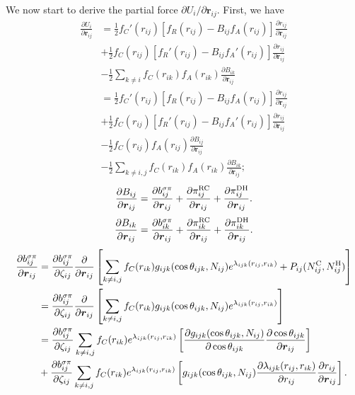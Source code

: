 \documentclass[12pt,a4paper]{report}
\newcommand{\vect}[1]{\boldsymbol{#1}}
\begin{document}
We now start to derive the partial force $\partial U_i/\partial \vect{r}_{ij}$. First, we have
\begin{align}
\frac{\partial U_i}{\partial \vect{r}_{ij}}
&= \frac{1}{2}f_C'(r_{ij})[f_R(r_{ij})-B_{ij}f_A(r_{ij})]\frac{\partial r_{ij}}{\partial \vect{r}_{ij}} \nonumber \\
&+ \frac{1}{2}f_C(r_{ij})[f_R'(r_{ij})-B_{ij}f_A'(r_{ij})]\frac{\partial r_{ij}}{\partial \vect{r}_{ij}} \nonumber \\
&- \frac{1}{2} \sum_{k\neq i} f_C(r_{ik})f_A(r_{ik}) \frac{\partial  B_{ik}}{\partial \vect{r}_{ij}} \nonumber\\
&= \frac{1}{2}f_C'(r_{ij})[f_R(r_{ij})-B_{ij}f_A(r_{ij})]\frac{\partial r_{ij}}{\partial \vect{r}_{ij}} \nonumber \\
&+ \frac{1}{2}f_C(r_{ij})[f_R'(r_{ij})-B_{ij}f_A'(r_{ij})]\frac{\partial r_{ij}}{\partial \vect{r}_{ij}} \nonumber \\
&- \frac{1}{2}  f_C(r_{ij})f_A(r_{ij}) \frac{\partial  B_{ij}}{\partial \vect{r}_{ij}} \nonumber\\
&- \frac{1}{2} \sum_{k\neq i,j} f_C(r_{ik})f_A(r_{ik}) \frac{\partial  B_{ik}}{\partial \vect{r}_{ij}};
\end{align}
\begin{align}
\frac{\partial  B_{ij}}{\partial \vect{r}_{ij}} = 
\frac{\partial  b_{ij}^{\sigma\pi}}{\partial \vect{r}_{ij}} +
\frac{\partial  \pi_{ij}^{\rm RC}}{\partial \vect{r}_{ij}} +
\frac{\partial  \pi_{ij}^{\rm DH}}{\partial \vect{r}_{ij}}.
\end{align}
\begin{align}
\frac{\partial  B_{ik}}{\partial \vect{r}_{ij}} = 
\frac{\partial  b_{ik}^{\sigma\pi}}{\partial \vect{r}_{ij}} +
\frac{\partial  \pi_{ik}^{\rm RC}}{\partial \vect{r}_{ij}} +
\frac{\partial  \pi_{ik}^{\rm DH}}{\partial \vect{r}_{ij}}.
\end{align}
\begin{align} 
\frac{\partial  b_{ij}^{\sigma\pi}}{\partial \vect{r}_{ij}} 
&= \frac{\partial  b_{ij}^{\sigma\pi}}{\partial \zeta_{ij}}
\frac{\partial }{\partial \vect{r}_{ij}}  \left[ \sum_{k\neq i, j} f_C(r_{ik}) g_{ijk}(\cos\theta_{ijk}, N_{ij})e^{\lambda_{ijk}(r_{ij},r_{ik})}  + P_{ij}(N_{ij}^{\rm C}, N_{ij}^{\rm H})\right] \nonumber \\
&=\frac{\partial  b_{ij}^{\sigma\pi}}{\partial \zeta_{ij}}  \frac{\partial }{\partial \vect{r}_{ij}}  
\left[ \sum_{k\neq i, j} f_C(r_{ik}) g_{ijk}(\cos\theta_{ijk}, N_{ij})e^{\lambda_{ijk}(r_{ij},r_{ik})} \right] \nonumber \\ 
&= \frac{\partial  b_{ij}^{\sigma\pi}}{\partial \zeta_{ij}}  \sum_{k\neq i, j} f_C(r_{ik}) e^{\lambda_{ijk}(r_{ij},r_{ik})} 
\left[ \frac{\partial g _{ijk}(\cos\theta_{ijk}, N_{ij})}{\partial \cos\theta_{ijk} } \frac{\partial \cos\theta_{ijk}}{\partial \vect{r}_{ij}} 
\right] 
\nonumber \\ 
&+  \frac{\partial  b_{ij}^{\sigma\pi}}{\partial \zeta_{ij}} \sum_{k\neq i, j} f_C(r_{ik}) e^{\lambda_{ijk}(r_{ij},r_{ik})} 
\left[
g_{ijk}(\cos\theta_{ijk}, N_{ij}) \frac{\partial \lambda_{ijk}(r_{ij},r_{ik})}{\partial r_{ij}} \frac{\partial r_{ij}}{\partial \vect{r}_{ij}} 
\right].
\end{align}
\end{document}

